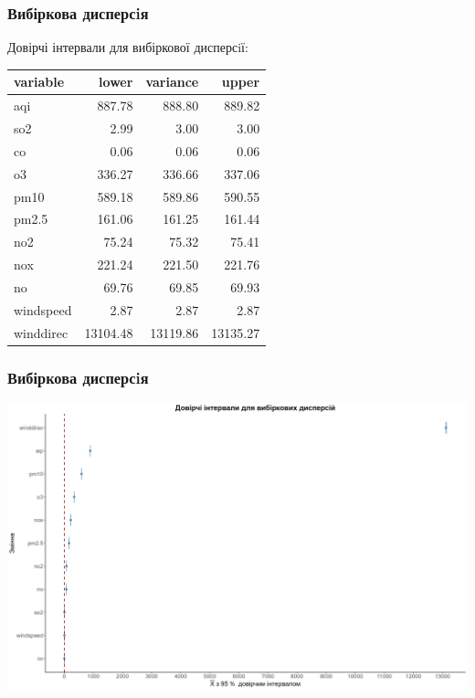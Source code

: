 \documentclass{beamer}
\begin{document}
\begin{frame}
  \frametitle{Вибіркова дисперсiя}

  Довірчі інтервали для вибіркової дисперсiї:

  \begin{table}[ht]
    \centering
    \begin{tabular}{lrrr}
      \hline
      variable  & lower & variance & upper \\ 
      \hline
      aqi       & 887.78 & 888.80 & 889.82 \\ 
      so2       & 2.99 & 3.00 & 3.00 \\ 
      co        & 0.06 & 0.06 & 0.06 \\ 
      o3        & 336.27 & 336.66 & 337.06 \\ 
      pm10      & 589.18 & 589.86 & 590.55 \\ 
      pm2.5     & 161.06 & 161.25 & 161.44 \\ 
      no2       & 75.24 & 75.32 & 75.41 \\ 
      nox       & 221.24 & 221.50 & 221.76 \\ 
      no        & 69.76 & 69.85 & 69.93 \\ 
      windspeed & 2.87 & 2.87 & 2.87 \\ 
      winddirec & 13104.48 & 13119.86 & 13135.27 \\ 
       \hline
    \end{tabular}
  \end{table}
\end{frame}

\begin{frame}
  \frametitle{Вибіркова дисперсiя}

  \begin{center}
    \includegraphics[width=\linewidth]{./plots/lab2/1-4-part/ci-var.png}
  \end{center}
  
\end{frame}
\end{document}

